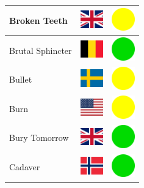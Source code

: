 \documentclass[12pt, a4paper, twoside]{report}
\begin{document}
\begin{center}
\begin{longtable}{|p{5cm}|p{2cm}|p{2cm}|}
Broken Teeth & \includegraphics[width=1cm]{4x3/gb} & \includegraphics[width=1cm]{likes/m} \\ \hline
Brutal Sphincter & \includegraphics[width=1cm]{4x3/be} & \includegraphics[width=1cm]{likes/y} \\ \hline
Bullet & \includegraphics[width=1cm]{4x3/se} & \includegraphics[width=1cm]{likes/m} \\ \hline
Burn & \includegraphics[width=1cm]{4x3/us} & \includegraphics[width=1cm]{likes/m} \\ \hline
Bury Tomorrow & \includegraphics[width=1cm]{4x3/gb} & \includegraphics[width=1cm]{likes/y} \\ \hline
Cadaver & \includegraphics[width=1cm]{4x3/no} & \includegraphics[width=1cm]{likes/y} \\ \hline

\end{longtable}
\end{center}
\end{document}
